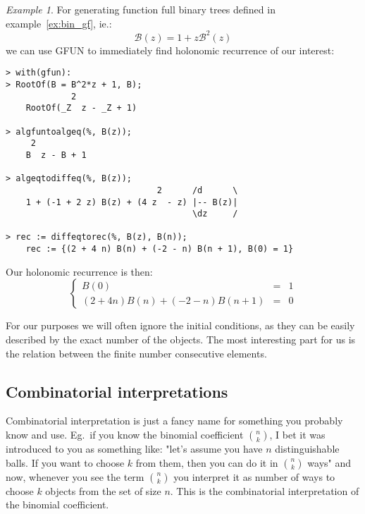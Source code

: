 \documentclass[final]{article}
\theoremstyle{definition}
\theoremstyle{remark}
\newtheorem{example}{Example}[subsection]
\newcommand{\gf}[1]{\ensuremath{\mathcal{#1}}}
\begin{document}
\begin{example}
    \label{ex:gfun-rec}
    For generating function full binary trees defined in example\ \ref{ex:bin_gf}, ie.:
    \[\gf{B}(z) = 1 + z\gf{B}^2(z)\]
    we can use GFUN\cite{gfun} to immediately find holonomic recurrence of our interest:

    \begin{lstlisting}
> with(gfun):
> RootOf(B = B^2*z + 1, B);
             2
    RootOf(_Z  z - _Z + 1)

> algfuntoalgeq(%, B(z));
     2
    B  z - B + 1

> algeqtodiffeq(%, B(z));
                              2      /d      \
    1 + (-1 + 2 z) B(z) + (4 z  - z) |-- B(z)|
                                     \dz     /

> rec := diffeqtorec(%, B(z), B(n));
    rec := {(2 + 4 n) B(n) + (-2 - n) B(n + 1), B(0) = 1}
    \end{lstlisting}

    Our holonomic recurrence is then:
    \[\left\{\begin{array}{rcl}
                B(0) &=& 1\\
                (2 + 4 n) B(n) + (-2 - n) B(n + 1) &=& 0
    \end{array}\right.\]

    For our purposes we will often ignore the initial conditions, as they can be easily described by the exact number of the objects. The most interesting part for us is the relation between the finite number consecutive elements.

\end{example}

\subsection{Combinatorial interpretations}%
\label{sub:combinatorial_interpretations}

Combinatorial interpretation is just a fancy name for something you probably know and use. Eg.\ if you know the binomial coefficient \(\binom{n}{k}\), I bet it was introduced to you as something like: "let's assume you have \(n\) distinguishable balls. If you want to choose \(k\) from them, then you can do it in \(\binom{n}{k}\) ways" and now, whenever you see the term \(\binom{n}{k}\) you interpret it as number of ways to choose \(k\) objects from the set of size \(n\). This is the combinatorial interpretation of the binomial coefficient.
\end{document}
